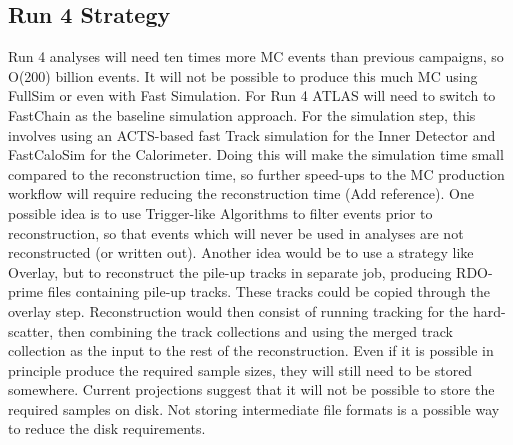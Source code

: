 \subsection{Run 4 Strategy}
Run 4 analyses will need ten times more MC events than previous campaigns, so O(200) billion events. It will not be possible to produce this much MC using FullSim or even with Fast Simulation. For Run 4 ATLAS will need to switch to FastChain as the baseline simulation approach. For the simulation step, this involves using an ACTS-based fast Track simulation for the Inner Detector and FastCaloSim for the Calorimeter. Doing this will make the simulation time small compared to the reconstruction time, so further speed-ups to the MC production workflow will require reducing the reconstruction time (Add reference).  One possible idea is to use Trigger-like Algorithms to filter events prior to reconstruction, so that events which will never be used in analyses are not reconstructed (or written out). Another idea would be to use a strategy like Overlay, but to reconstruct the pile-up tracks in separate job, producing RDO-prime files containing pile-up tracks. These tracks could be copied through the overlay step. Reconstruction would then consist of running tracking for the hard-scatter, then combining the track collections and using the merged track collection as the input to the rest of the reconstruction.
Even if it is possible in principle produce the required sample sizes, they will still need to be stored somewhere. Current projections suggest that it will not be possible to store the required samples on disk.  Not storing intermediate file formats is a possible way to reduce the disk requirements.

